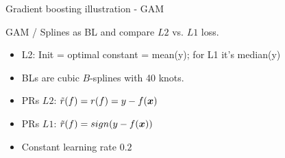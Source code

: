\begin{vbframe}{Gradient boosting illustration - GAM}

GAM / Splines as BL and compare $L2$ vs. $L1$ loss.
\vspace*{0.2cm}

\begin{itemize}
  \item L2: Init = optimal constant = mean(y);
      for L1 it's median(y)
    \item BLs are cubic $B$-splines with 40 knots.
\item PRs $L2$: $\tilde{r}(f) = r(f) = y - f(\bm{x})$
\item PRs $L1$: $\tilde{r}(f) = sign(y - f(\bm{x}))$
    \item Constant learning rate $0.2$ 
\end{itemize}


\end{vbframe}
